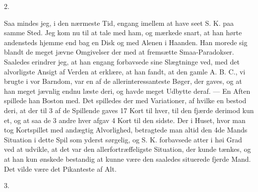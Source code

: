 \documentclass[12pt,a4paper,openany]{book}
\newcommand{\secnum}[1]{\par\begin{center}#1\end{center}\par\nobreak}
\begin{document}
\secnum{2.}

Saa mindes jeg, i den nærmeste Tid, engang imellem
at have seet S. K. paa samme Sted. Jeg kom nu til at
tale med ham, og mærkede snart, at han hørte andensteds
hjemme end bag en Disk og med Alenen i Haanden.
Han morede sig blandt de meget jævne Omgivelser der
med at fremsætte Smaa-Paradokser. Saaledes erindrer
jeg, at han engang forbavsede sine Slægtninge ved, med
det alvorligste Ansigt af Verden at erklære, at han fandt,
at den gamle A. B. C., vi brugte i vor Barndom, var en
af de allerinteressanteste Bøger, der gaves, og at han
meget jævnlig endnu læste deri, og havde meget Udbytte
deraf. --- En Aften spillede han Boston med. Det spilledes
der med Variationer, af hvilke en bestod deri, at
der til 3 af de Spillende gaves 17 Kort til hver, til den
fjærde derimod kun et, og at saa de 3 andre hver afgav
4 Kort til den sidste. Der i Huset, hvor man tog Kortspillet
med andægtig Alvorlighed, betragtede man altid
den 4de Mands Situation i dette Spil som yderst sørgelig,
og S. K. forbavsede atter i høi Grad ved at udvikle, at
det var den allerfortræffeligste Situation, der kunde
tænkes, og at han kun ønskede bestandig at kunne være
den saaledes situerede fjerde Mand. Det vilde være det
Pikanteste af Alt.

\secnum{3.}
\end{document}
